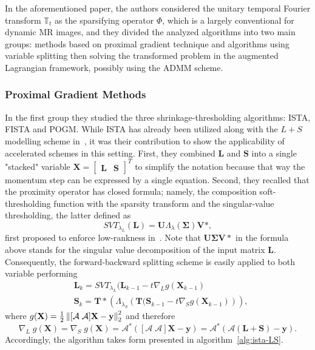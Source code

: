 In the aforementioned paper, the authors considered the unitary temporal Fourier transform $\mathbb{T}_t$ as the sparsifying operator $\Phi$, which is a largely conventional for dynamic MR images, and they divided the analyzed algorithms into two main groups: methods based on proximal gradient technique and algorithms using variable splitting then solving the transformed problem in the augmented Lagrangian framework, possibly using the ADMM scheme.

\subsubsection{Proximal Gradient Methods}
In the first group they studied the three shrinkage-thresholding algorithms: ISTA, FISTA and POGM. While ISTA has already been utilized along with the $L+S$ modelling scheme in~\cite{otazo_lowrank_2015}, it was their contribution to show the applicability of accelerated schemes in this setting. First, they combined $\mathbf{L}$ and $\mathbf{S}$ into a single "stacked" variable $\mathbf{X} = \left[\begin{matrix}\mathbf{L} & \mathbf{S}\end{matrix}\right]^T$ to simplify the notation because that way the momentum step can be expressed by a single equation. Second, they recalled that the proximity operator has closed formula; namely, the composition soft-thresholding function with the sparsity transform and the singular-value thresholding, the latter defined as
\[SVT_{\lambda_L}(\mathbf{L}) = \mathbf{U}\Lambda_\lambda(\boldsymbol{\Sigma})\mathbf{V}*,\]
first proposed to enforce low-rankness in~\cite{cai_singular_2008}. Note that $\mathbf{U}\boldsymbol{\Sigma}\mathbf{V}*$ in the formula above stands for the singular value decomposition of the input matrix $\mathbf{L}$. Consequently, the forward-backward splitting scheme is easily applied to both variable performing
\begin{align*}
    & \mathbf{L}_k = SVT_{\lambda_L}(\mathbf{L}_{k-1} - t \nabla_L g(\mathbf{X}_{k-1})\\
    & \mathbf{S}_k = \mathbf{T}*\left(\Lambda_{\lambda_S}\left(\mathbf{T}(\mathbf{S}_{k-1} - t \nabla_S g(\mathbf{X}_{k-1})\right)\right),
\end{align*}
where $g(\mathbf{X}) = \frac{1}{2}\left\lVert[\mathcal{A} \; \mathcal{A}]\mathbf{X} - \mathbf{y}\right\rVert_2^2$ and therefore \[\nabla_L\; g(\mathbf{X}) = \nabla_S\; g(\mathbf{X}) = \mathcal{A}^*([\mathcal{A} \; \mathcal{A}]\mathbf{X} - \mathbf{y}) = \mathcal{A}^*(\mathcal{A} (\mathbf{L + S}) - \mathbf{y}).\] Accordingly, the algorithm takes form presented in algorithm~\ref{alg:ista-LS}.

